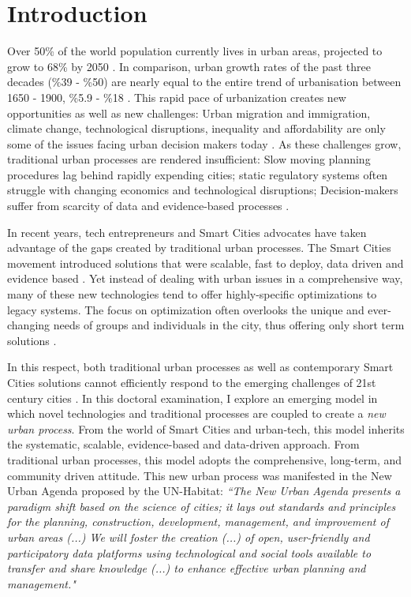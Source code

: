 \section*{Introduction}
Over 50\% of the world population currently lives in urban areas, projected to grow to 68\% by 2050 \cite{united2018world}. In comparison, urban growth rates of the past three decades (\%39 - \%50) are nearly equal to the entire trend of urbanisation between 1650 - 1900, \%5.9 - \%18 \cite{grauman1976orders, chen2014global}. This rapid pace of urbanization creates new opportunities as well as new challenges: Urban migration and immigration, climate change, technological disruptions, inequality and affordability are only some of the issues facing urban decision makers today \cite{parnell2016defining, reckien2017climate}. As these challenges grow, traditional urban processes are rendered insufficient: Slow moving planning procedures lag behind rapidly expending cities; static regulatory systems often struggle with changing economics and technological disruptions; Decision-makers suffer from scarcity of data and evidence-based processes \cite{world2016inspiring}.\par
In recent years, tech entrepreneurs and Smart Cities advocates have taken advantage of the gaps created by traditional urban processes. The Smart Cities movement introduced solutions that were scalable, fast to deploy, data driven and evidence based \cite{soderstrom2014smart}. Yet instead of dealing with urban issues in a comprehensive way, many of these new technologies tend to offer highly-specific optimizations to legacy systems. The focus on optimization often overlooks the unique and ever-changing needs of groups and individuals in the city, thus offering only short term solutions \cite{gaffney2018smarter}.\par
In this respect, both traditional urban processes as well as contemporary Smart Cities solutions cannot efficiently respond to the emerging challenges of 21st century cities \cite{soderstrom2014smart}. In this doctoral examination, I explore an emerging model in which novel technologies and traditional processes are coupled to create a \textit{new urban process}. From the world of Smart Cities and urban-tech, this model inherits the systematic, scalable, evidence-based and data-driven approach. From traditional urban processes, this model adopts the comprehensive, long-term, and community driven attitude. This new urban process was manifested in the New Urban Agenda proposed by the UN-Habitat:  
{\textit{``The New Urban Agenda presents a paradigm shift based on the science of cities; it lays out standards and principles for the planning, construction, development, management, and improvement of urban areas (...) We will foster the creation (...) of open, user-friendly and participatory data platforms using technological and social tools available to transfer and share knowledge (...) to enhance effective urban planning and management."}} \cite{habitat2016new}
